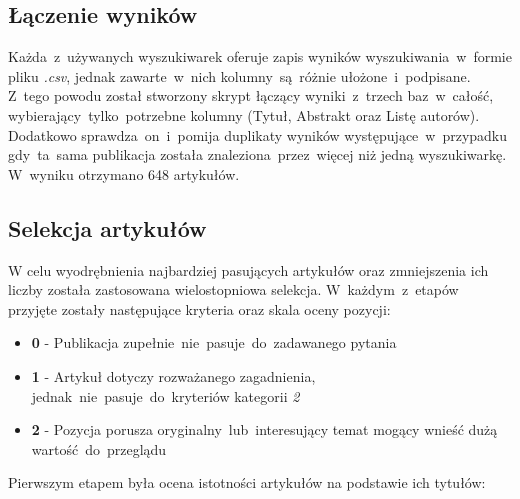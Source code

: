 \subsection{Łączenie wyników}
Każda~z~używanych wyszukiwarek oferuje zapis wyników wyszukiwania~w~formie pliku {\it .csv}, jednak zawarte~w~nich kolumny~są~różnie ułożone~i~podpisane. Z~tego powodu został stworzony skrypt łączący wyniki~z~trzech baz~w~całość, wybierający~tylko~potrzebne kolumny (Tytuł, Abstrakt oraz Listę autorów). Dodatkowo sprawdza~on~i~pomija duplikaty wyników występujące~w~przypadku gdy~ta~sama publikacja została znaleziona~przez~więcej niż jedną wyszukiwarkę. W~wyniku otrzymano 648 artykułów.

\subsection{Selekcja artykułów}
W celu wyodrębnienia najbardziej pasujących artykułów oraz zmniejszenia ich liczby została zastosowana wielostopniowa selekcja. W~każdym~z~etapów przyjęte zostały następujące kryteria oraz skala oceny pozycji:
\begin{itemize}
    \item {\bf 0} - Publikacja zupełnie~nie~pasuje~do~zadawanego pytania
    \item {\bf 1} - Artykuł dotyczy rozważanego zagadnienia, jednak~nie~pasuje~do~kryteriów kategorii {\it 2}
    \item {\bf 2} - Pozycja porusza oryginalny~lub~interesujący temat mogący wnieść dużą wartość~do~przeglądu
\end{itemize}

\noindent Pierwszym etapem była ocena istotności artykułów na podstawie ich tytułów:

